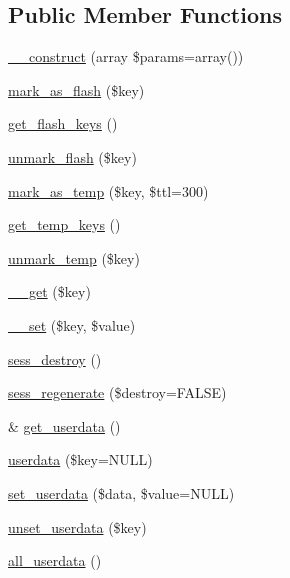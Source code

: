 \subsection*{Public Member Functions}
\begin{DoxyCompactItemize}
\item 
\hyperlink{class_c_i___session_a85ac5b7f54ad67ec6b5b9dc282717602}{\+\_\+\+\_\+construct} (array \$params=array())
\item 
\hyperlink{class_c_i___session_a81fdbc2498fc26532aee037f03dbaf55}{mark\+\_\+as\+\_\+flash} (\$key)
\item 
\hyperlink{class_c_i___session_a996e70387750cdc480712c1585743d8d}{get\+\_\+flash\+\_\+keys} ()
\item 
\hyperlink{class_c_i___session_a8e89303bfdff75a20528986c2bcdba86}{unmark\+\_\+flash} (\$key)
\item 
\hyperlink{class_c_i___session_ab55f3c6806c359d98edd6138ef33ecf0}{mark\+\_\+as\+\_\+temp} (\$key, \$ttl=300)
\item 
\hyperlink{class_c_i___session_a4fd9f48ff9bcf093778529cb7389eddb}{get\+\_\+temp\+\_\+keys} ()
\item 
\hyperlink{class_c_i___session_a602eaf2b4a6936ed9bb8750892fac551}{unmark\+\_\+temp} (\$key)
\item 
\hyperlink{class_c_i___session_a4537dad3b44254124991341cc91b28fb}{\+\_\+\+\_\+get} (\$key)
\item 
\hyperlink{class_c_i___session_a79b36d71c6f1d4f9e6c4c3e34c081456}{\+\_\+\+\_\+set} (\$key, \$value)
\item 
\hyperlink{class_c_i___session_a9451d1625c402b8d712aedaa5ebc752d}{sess\+\_\+destroy} ()
\item 
\hyperlink{class_c_i___session_afec342ef8722ac0ce4a672e6cfad60c0}{sess\+\_\+regenerate} (\$destroy=F\+A\+L\+S\+E)
\item 
\& \hyperlink{class_c_i___session_a85456fcd9f556e20767051fc33762607}{get\+\_\+userdata} ()
\item 
\hyperlink{class_c_i___session_ab10006d10762845f93392ef4c2884df6}{userdata} (\$key=N\+U\+L\+L)
\item 
\hyperlink{class_c_i___session_a17de7d10cbbe8162d16bfc43083e74aa}{set\+\_\+userdata} (\$data, \$value=N\+U\+L\+L)
\item 
\hyperlink{class_c_i___session_a8d3a4935d2ff2088f11654445d9a0122}{unset\+\_\+userdata} (\$key)
\item 
\hyperlink{class_c_i___session_a974fa60ddc074b14ffcc78ef9902bc5c}{all\+\_\+userdata} ()
\item 

\end{DoxyCompactItemize}
